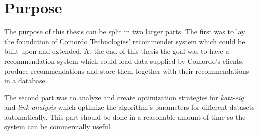 
\section{Purpose}\label{sec:intro:purpose}

The purpose of this thesis can be split in two larger parts. The first was to lay the foundation of Comordo Technologies' recommender system which could be built upon and extended. At the end of this thesis the goal was to have a recommendation system which could load data supplied by Comordo's clients, produce recommendations and store them together with their recommendations in a database.

The second part was to analyze and create optimization strategies for \textit{katz-eig} and \textit{link-analysis} which optimize the algorithm's parameters for different datasets automatically. This part should be done in a reasonable amount of time so the system can be commercially useful.

